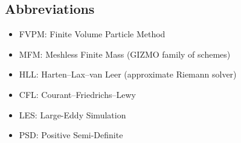 \subsection{Abbreviations}
\begin{itemize}[noitemsep,topsep=0pt]
  \item FVPM: Finite Volume Particle Method
  \item MFM: Meshless Finite Mass (GIZMO family of schemes)
  \item HLL: Harten--Lax--van Leer (approximate Riemann solver)
  \item CFL: Courant--Friedrichs--Lewy
  \item LES: Large-Eddy Simulation
  \item PSD: Positive Semi-Definite
\end{itemize}
